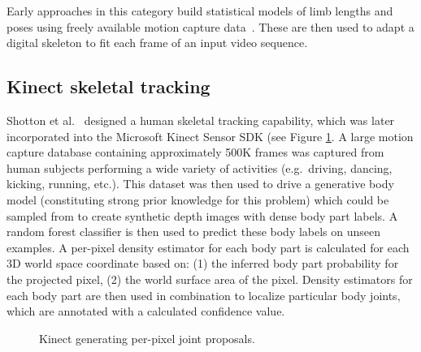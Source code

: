 Early approaches in this category build statistical models of limb lengths and poses using freely available motion capture data~\cite{barron2001estimating}. These are then used to adapt a digital skeleton to fit each frame of an input video sequence.  

    \subsection{Kinect skeletal tracking}
    Shotton et al.~\cite{kinectpaper} designed a human skeletal tracking capability, which was later incorporated into the Microsoft Kinect Sensor SDK (see Figure \ref{fig:kinect_skeleton}. A large motion capture database containing approximately 500K frames was captured from human subjects performing a wide variety of activities (e.g.\ driving, dancing, kicking, running, etc.). This dataset was then used to drive a generative body model (constituting strong prior knowledge for this problem) which could be sampled from to create synthetic depth images with dense body part labels. A random forest classifier is then used to predict these body labels on unseen examples. A per-pixel density estimator for each body part is calculated for each 3D world space coordinate based on: (1) the inferred body part probability for the projected pixel, (2) the world surface area of the pixel. Density estimators for each body part are then used in combination to localize particular body joints, which are annotated with a calculated confidence value. 

    \begin{figure}[H] %
        \caption{Kinect generating per-pixel joint proposals.}
        \label{fig:kinect_skeleton}
    \end{figure}

